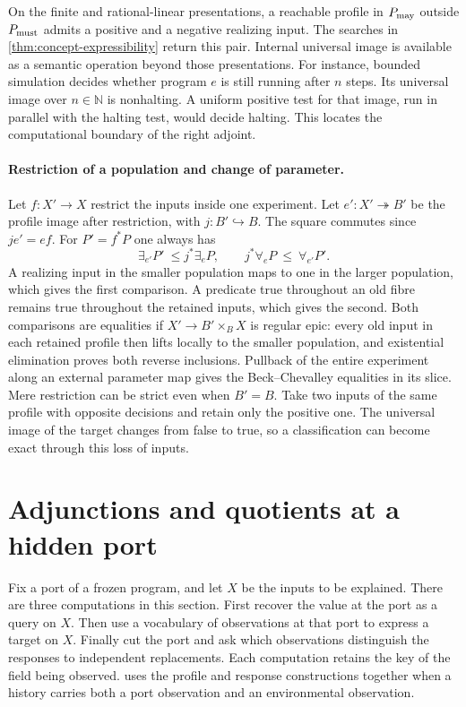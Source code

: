 \documentclass[11pt,a4paper]{article}
\theoremstyle{definition}
\theoremstyle{remark}\newaliascnt{remark}{theorem}
\newcommand{\N}{\mathbb N}
\numberwithin{equation}{section}
\begin{document}
On the finite and rational-linear presentations, a reachable profile in \(P_{\rm may}\) outside \(P_{\rm must}\) admits a positive and a negative realizing input. The searches in \cref{thm:concept-expressibility} return this pair. Internal universal image is available as a semantic operation beyond those presentations. For instance, bounded simulation decides whether program \(e\) is still running after \(n\) steps. Its universal image over \(n\in\N\) is nonhalting. A uniform positive test for that image, run in parallel with the halting test, would decide halting. This locates the computational boundary of the right adjoint.



\paragraph{Restriction of a population and change of parameter.}
Let \(f:X'\to X\) restrict the inputs inside one experiment. Let \(e':X'\twoheadrightarrow B'\) be the profile image after restriction, with \(j:B'\hookrightarrow B\). The square commutes since \(je'=ef\). For \(P'=f^*P\) one always has
\[
 \exists_{e'}P'\ \le j^*\exists_eP,\qquad
 j^*\forall_eP\ \le\ \forall_{e'}P'.
\]
A realizing input in the smaller population maps to one in the larger population, which gives the first comparison. A predicate true throughout an old fibre remains true throughout the retained inputs, which gives the second. Both comparisons are equalities if \(X'\to B'\times_B X\) is regular epic: every old input in each retained profile then lifts locally to the smaller population, and existential elimination proves both reverse inclusions. Pullback of the entire experiment along an external parameter map gives the Beck--Chevalley equalities in its slice. Mere restriction can be strict even when \(B'=B\). Take two inputs of the same profile with opposite decisions and retain only the positive one. The universal image of the target changes from false to true, so a classification can become exact through this loss of inputs.

\section{Adjunctions and quotients at a hidden port}\label{sec:hidden-concepts}
Fix a port of a frozen program, and let $X$ be the inputs to be explained. There are three computations in this section. First recover the value at the port as a query on $X$. Then use a vocabulary of observations at that port to express a target on $X$. Finally cut the port and ask which observations distinguish the responses to independent replacements. Each computation retains the key of the field being observed.  uses the profile and response constructions together when a history carries both a port observation and an environmental observation.
\end{document}
